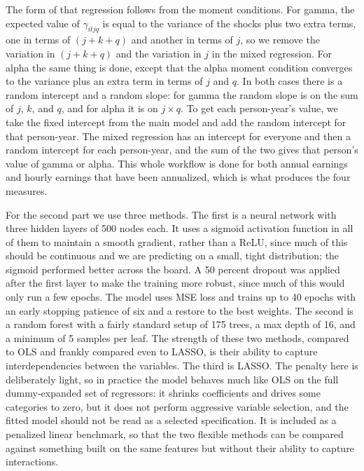 \documentclass[12pt]{article}
\begin{document}
\begin{onehalfspace}
The form of that regression follows from the moment conditions. For gamma, the expected value of $\gamma_{itjq}$ is equal to the variance of the shocks plus two extra terms, one in terms of $(j+k+q)$ and another in terms of $j$, so we remove the variation in $(j+k+q)$ and the variation in $j$ in the mixed regression. For alpha the same thing is done, except that the alpha moment condition converges to the variance plus an extra term in terms of $j$ and $q$. In both cases there is a random intercept and a random slope: for gamma the random slope is on the sum of $j$, $k$, and $q$, and for alpha it is on $j \times q$. To get each person-year's value, we take the fixed intercept from the main model and add the random intercept for that person-year. The mixed regression has an intercept for everyone and then a random intercept for each person-year, and the sum of the two gives that person's value of gamma or alpha. This whole workflow is done for both annual earnings and hourly earnings that have been annualized, which is what produces the four measures.

For the second part we use three methods. The first is a neural network with three hidden layers of 500 nodes each. It uses a sigmoid activation function in all of them to maintain a smooth gradient, rather than a ReLU, since much of this should be continuous and we are predicting on a small, tight distribution; the sigmoid performed better across the board. A 50 percent dropout was applied after the first layer to make the training more robust, since much of this would only run a few epochs. The model uses MSE loss and trains up to 40 epochs with an early stopping patience of six and a restore to the best weights. The second is a random forest with a fairly standard setup of 175 trees, a max depth of 16, and a minimum of 5 samples per leaf. The strength of these two methods, compared to OLS and frankly compared even to LASSO, is their ability to capture interdependencies between the variables. The third is LASSO. The penalty here is deliberately light, so in practice the model behaves much like OLS on the full dummy-expanded set of regressors: it shrinks coefficients and drives some categories to zero, but it does not perform aggressive variable selection, and the fitted model should not be read as a selected specification. It is included as a penalized linear benchmark, so that the two flexible methods can be compared against something built on the same features but without their ability to capture interactions.


\end{onehalfspace}
\end{document}
